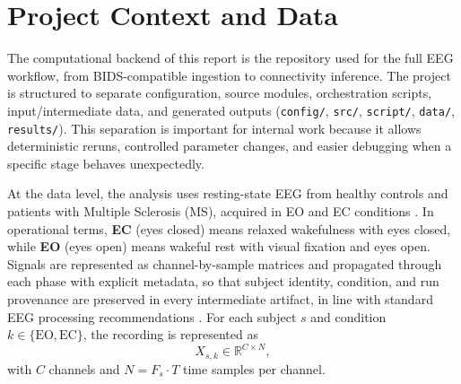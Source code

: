 \section{Project Context and Data}

The computational backend of this report is the \Julia{} repository used for the full EEG workflow, from BIDS-compatible ingestion to connectivity inference. The project is structured to separate configuration, source modules, orchestration scripts, input/intermediate data, and generated outputs (\texttt{config/}, \texttt{src/}, \texttt{script/}, \texttt{data/}, \texttt{results/}). This separation is important for internal work because it allows deterministic reruns, controlled parameter changes, and easier debugging when a specific stage behaves unexpectedly.

At the data level, the analysis uses resting-state EEG from healthy controls and patients with Multiple Sclerosis (MS), acquired in EO and EC conditions \citep{Mestre2021}. In operational terms, \textbf{EC} (eyes closed) means relaxed wakefulness with eyes closed, while \textbf{EO} (eyes open) means wakeful rest with visual fixation and eyes open. Signals are represented as channel-by-sample matrices and propagated through each phase with explicit metadata, so that subject identity, condition, and run provenance are preserved in every intermediate artifact, in line with standard EEG processing recommendations \citep{Yamada2018,Sanei2022,Cohen2014}.
For each subject $s$ and condition $k \in \{\mathrm{EO},\mathrm{EC}\}$, the recording is represented as
\[
X_{s,k} \in \mathbb{R}^{C \times N},
\]
with $C$ channels and $N = F_s \cdot T$ time samples per channel.

